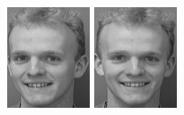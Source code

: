\begin{figure}[ht]
 \includegraphics[width=\columnwidth/11]{ch3/figures/s5_1.png}
 \includegraphics[width=\columnwidth/11]{ch3/figures/s5_2.png}

\end{figure}
